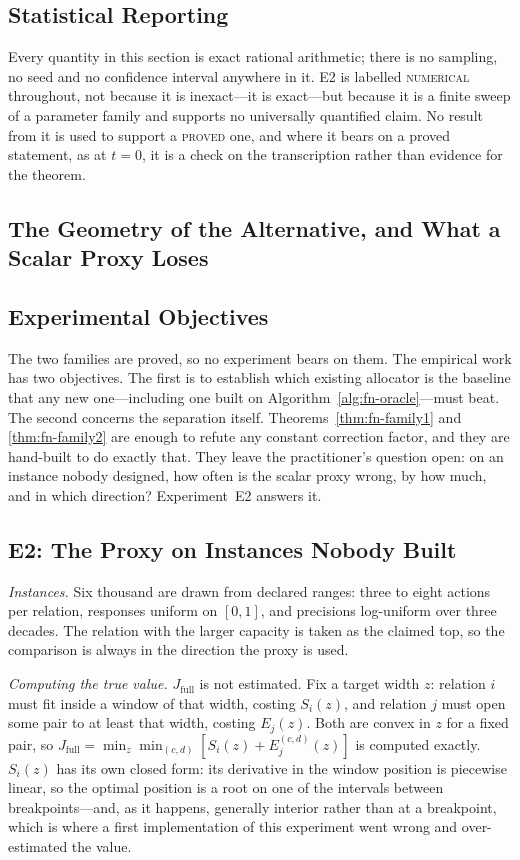 \documentclass[conference]{IEEEtran}
\theoremstyle{definition}
\newcommand{\PROVED}{\textsc{proved}}
\newcommand{\NUM}{\textsc{numerical}}
\begin{document}
\subsection{Statistical Reporting}

Every quantity in this section is exact rational arithmetic; there is no sampling, no seed and
no confidence interval anywhere in it. E2 is labelled \NUM{} throughout, not because it is
inexact---it is exact---but because it is a finite sweep of a parameter family and supports no
universally quantified claim. No result from it is used to support a \PROVED{} one, and where
it bears on a proved statement, as at $t=0$, it is a check on the transcription rather than
evidence for the theorem.


\subsection{The Geometry of the Alternative, and What a Scalar Proxy Loses}
\label{sec:fn-expdesign}

\subsection{Experimental Objectives}

The two families are proved, so no experiment bears on them. The empirical work has two
objectives. The first is to establish which existing allocator is the baseline that any new
one---including one built on Algorithm~\ref{alg:fn-oracle}---must beat. The second concerns the
separation itself. Theorems~\ref{thm:fn-family1} and \ref{thm:fn-family2} are enough to refute any
constant correction factor, and they are hand-built to do exactly that. They leave the
practitioner's question open: on an instance nobody designed, how often is the scalar proxy
wrong, by how much, and in which direction? Experiment~E2 answers it.

\subsection{E2: The Proxy on Instances Nobody Built}
\label{sec:fn-e2}

\emph{Instances.} Six thousand are drawn from declared ranges: three to eight actions per
relation, responses uniform on $[0,1]$, and precisions log-uniform over three decades. The
relation with the larger capacity is taken as the claimed top, so the comparison is always in
the direction the proxy is used.

\emph{Computing the true value.} $J_{\mathrm{full}}$ is not estimated. Fix a target width
$z$: relation $i$ must fit inside a window of that width, costing $S_{i}(z)$, and relation
$j$ must open some pair to at least that width, costing $E_{j}(z)$. Both are convex in $z$
for a fixed pair, so $J_{\mathrm{full}}=\min_{z}\min_{(c,d)}[S_{i}(z)+E^{(c,d)}_{j}(z)]$ is
computed exactly. $S_{i}(z)$ has its own closed form: its derivative in the window position
is piecewise linear, so the optimal position is a root on one of the intervals between
breakpoints---and, as it happens, generally interior rather than at a breakpoint, which is
where a first implementation of this experiment went wrong and over-estimated the value.
\end{document}
